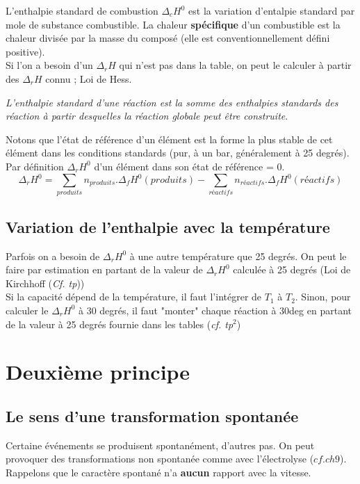 \documentclass[british,french,11pt, a4paper, openany]{book}
\begin{document}
L'enthalpie standard de combustion $\Delta_c H^0$ est la variation d'entalpie standard par mole de substance combustible.
La chaleur \textbf{spécifique} d'un combustible est la chaleur divisée par la masse du composé (elle est conventionnellement défini positive).\\

Si l'on a besoin d'un $\Delta_r H$ qui n'est pas dans la table, on peut le calculer à partir des $\Delta_r H$ connu ; Loi de Hess.
\begin{center}
	\textit{L'enthalpie standard d'une réaction est la somme des enthalpies standards des réaction à partir desquelles la réaction globale peut être construite}.
\end{center}
Notons que l'état de référence d'un élément est la forme la plus stable de cet élément dans les conditions standards (pur, à un bar, généralement à 25 degrés).\\
Par définition $\Delta_r H^0$ d'un élément dans son état de référence = 0.
$$\Delta_r H^0 = \sum_{produits} n_{produits}.\Delta_f H^0(produits) - \sum_{réactifs} n_{réactifs}.\Delta_f H^0(réactifs)$$

\subsection{Variation de l'enthalpie avec la température}
Parfois on a besoin de $\Delta_r H^0$ à une autre température que 25 degrés. On peut le faire par estimation en partant de la valeur de $\Delta_r H^0$ calculée à 25 degrés (Loi de Kirchhoff (\textit{Cf. tp}))\\
Si la capacité dépend de la température, il faut l'intégrer de $T_1$ à $T_2$. Sinon, pour calculer le $\Delta_r H^0$ à 30 degrés, il faut "monter" chaque réaction à 30deg en partant de la valeur à 25 degrés fournie dans les tables (\textit{cf. tp}$^2$)

\section{Deuxième principe}
\subsection{Le sens d'une transformation spontanée}
Certaine événements se produisent spontanément, d'autres pas. On peut provoquer des transformations non spontanée comme avec l'électrolyse ($cf. ch9$). Rappelons que le caractère spontané n'a \textbf{aucun} rapport avec la vitesse.\\
\end{document}
